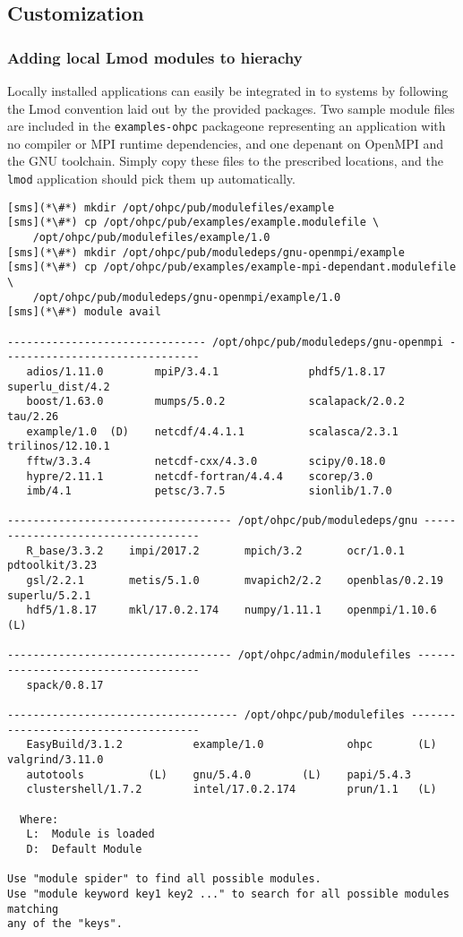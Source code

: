 \subsection{Customization} \label{appendix:customization}

\subsubsection{Adding local Lmod modules to \OHPC{} hierachy} \label{appendix:modulefiles}
Locally installed applications can easily be integrated in to \OHPC{} systems by
following the Lmod convention laid out by the provided packages. Two sample
module files are included in the \texttt{examples-ohpc} package\textemdash one
representing an application with no compiler or MPI runtime dependencies, and
one depenant on OpenMPI and the GNU toolchain. Simply copy these files to the
prescribed locations, and the \texttt{lmod} application should pick them up
automatically.

\begin{lstlisting}
[sms](*\#*) mkdir /opt/ohpc/pub/modulefiles/example
[sms](*\#*) cp /opt/ohpc/pub/examples/example.modulefile \
    /opt/ohpc/pub/modulefiles/example/1.0
[sms](*\#*) mkdir /opt/ohpc/pub/moduledeps/gnu-openmpi/example
[sms](*\#*) cp /opt/ohpc/pub/examples/example-mpi-dependant.modulefile \
    /opt/ohpc/pub/moduledeps/gnu-openmpi/example/1.0
[sms](*\#*) module avail

------------------------------- /opt/ohpc/pub/moduledeps/gnu-openmpi -------------------------------
   adios/1.11.0        mpiP/3.4.1              phdf5/1.8.17 superlu_dist/4.2
   boost/1.63.0        mumps/5.0.2             scalapack/2.0.2    tau/2.26
   example/1.0  (D)    netcdf/4.4.1.1          scalasca/2.3.1 trilinos/12.10.1
   fftw/3.3.4          netcdf-cxx/4.3.0        scipy/0.18.0
   hypre/2.11.1        netcdf-fortran/4.4.4    scorep/3.0
   imb/4.1             petsc/3.7.5             sionlib/1.7.0

----------------------------------- /opt/ohpc/pub/moduledeps/gnu -----------------------------------
   R_base/3.3.2    impi/2017.2       mpich/3.2       ocr/1.0.1 pdtoolkit/3.23
   gsl/2.2.1       metis/5.1.0       mvapich2/2.2    openblas/0.2.19 superlu/5.2.1
   hdf5/1.8.17     mkl/17.0.2.174    numpy/1.11.1    openmpi/1.10.6  (L)

----------------------------------- /opt/ohpc/admin/modulefiles ------------------------------------
   spack/0.8.17

------------------------------------ /opt/ohpc/pub/modulefiles -------------------------------------
   EasyBuild/3.1.2           example/1.0             ohpc       (L) valgrind/3.11.0
   autotools          (L)    gnu/5.4.0        (L)    papi/5.4.3
   clustershell/1.7.2        intel/17.0.2.174        prun/1.1   (L)

  Where:
   L:  Module is loaded
   D:  Default Module

Use "module spider" to find all possible modules.
Use "module keyword key1 key2 ..." to search for all possible modules matching
any of the "keys".
\end{lstlisting}


